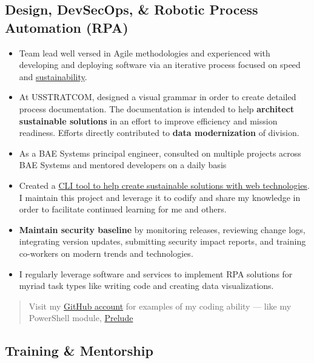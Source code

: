 \documentclass[10pt]{article}
\def\tightlist{}
\begin{document}
\subsection{Design, DevSecOps, \& Robotic Process Automation
(RPA)}\label{design-devsecops-robotic-process-automation-rpa}

\begin{itemize}
\tightlist
\item
  Team lead well versed in Agile methodologies and experienced with
  developing and deploying software via an iterative process focused on
  speed and \href{http://sustainable.surge.sh/}{sustainability}.
\item
  At USSTRATCOM, designed a visual grammar in order to create detailed
  process documentation. The documentation is intended to help
  \textbf{architect sustainable solutions} in an effort to improve
  efficiency and mission readiness. Efforts directly contributed to
  \textbf{data modernization} of division.
\item
  As a BAE Systems principal engineer, consulted on multiple projects
  across BAE Systems and mentored developers on a daily basis
\item
  Created a \href{https://github.com/jhwohlgemuth/tomo-cli}{CLI tool to
  help create sustainable solutions with web technologies}. I maintain
  this project and leverage it to codify and share my knowledge in order
  to facilitate continued learning for me and others.
\item
  \textbf{Maintain security baseline} by monitoring releases, reviewing
  change logs, integrating version updates, submitting security impact
  reports, and training co-workers on modern trends and technologies.
\item
  I regularly leverage software and services to implement RPA solutions
  for myriad task types like writing code and creating data
  visualizations.
\end{itemize}

\begin{quote}
Visit my \href{https://github.com/jhwohlgemuth}{GitHub account} for
examples of my coding ability --- like my PowerShell module,
\href{https://github.com/jhwohlgemuth/pwsh-prelude}{Prelude}
\end{quote}

\subsection{Training \& Mentorship}\label{training-mentorship}
\end{document}

